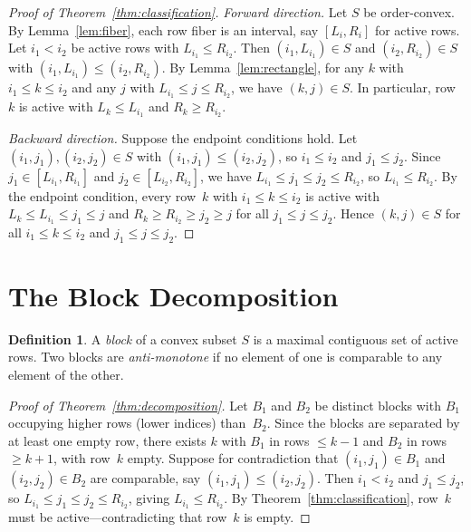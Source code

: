 \documentclass[11pt,a4paper]{article}
\theoremstyle{plain}
\theoremstyle{definition}
\newtheorem{definition}[theorem]{Definition}
\theoremstyle{remark}
\begin{document}
\begin{proof}[Proof of Theorem~\ref{thm:classification}]
\textit{Forward direction.}
Let $S$ be order-convex.
By Lemma~\ref{lem:fiber}, each row fiber is an interval, say $[L_i, R_i]$ for active rows.
Let $i_1 < i_2$ be active rows with $L_{i_1} \leq R_{i_2}$.
Then $(i_1, L_{i_1}) \in S$ and $(i_2, R_{i_2}) \in S$ with $(i_1, L_{i_1}) \leq (i_2, R_{i_2})$.
By Lemma~\ref{lem:rectangle}, for any $k$ with $i_1 \leq k \leq i_2$ and any $j$ with $L_{i_1} \leq j \leq R_{i_2}$, we have $(k, j) \in S$.
In particular, row~$k$ is active with $L_k \leq L_{i_1}$ and $R_k \geq R_{i_2}$.

\textit{Backward direction.}
Suppose the endpoint conditions hold.
Let $(i_1, j_1), (i_2, j_2) \in S$ with $(i_1, j_1) \leq (i_2, j_2)$, so $i_1 \leq i_2$ and $j_1 \leq j_2$.
Since $j_1 \in [L_{i_1}, R_{i_1}]$ and $j_2 \in [L_{i_2}, R_{i_2}]$, we have $L_{i_1} \leq j_1 \leq j_2 \leq R_{i_2}$, so $L_{i_1} \leq R_{i_2}$.
By the endpoint condition, every row~$k$ with $i_1 \leq k \leq i_2$ is active with $L_k \leq L_{i_1} \leq j_1 \leq j$ and $R_k \geq R_{i_2} \geq j_2 \geq j$ for all $j_1 \leq j \leq j_2$.
Hence $(k, j) \in S$ for all $i_1 \leq k \leq i_2$ and $j_1 \leq j \leq j_2$.
\end{proof}


\section{The Block Decomposition}\label{sec:blocks}

\begin{definition}
A \emph{block} of a convex subset $S$ is a maximal contiguous set of active rows.
Two blocks are \emph{anti-monotone} if no element of one is comparable to any element of the other.
\end{definition}

\begin{proof}[Proof of Theorem~\ref{thm:decomposition}]
Let $B_1$ and $B_2$ be distinct blocks with $B_1$ occupying higher rows (lower indices) than~$B_2$.
Since the blocks are separated by at least one empty row, there exists $k$ with $B_1$ in rows $\leq k-1$ and $B_2$ in rows $\geq k+1$, with row~$k$ empty.
Suppose for contradiction that $(i_1, j_1) \in B_1$ and $(i_2, j_2) \in B_2$ are comparable, say $(i_1, j_1) \leq (i_2, j_2)$.
Then $i_1 < i_2$ and $j_1 \leq j_2$, so $L_{i_1} \leq j_1 \leq j_2 \leq R_{i_2}$, giving $L_{i_1} \leq R_{i_2}$.
By Theorem~\ref{thm:classification}, row~$k$ must be active---contradicting that row~$k$ is empty.
\end{proof}
\end{document}
